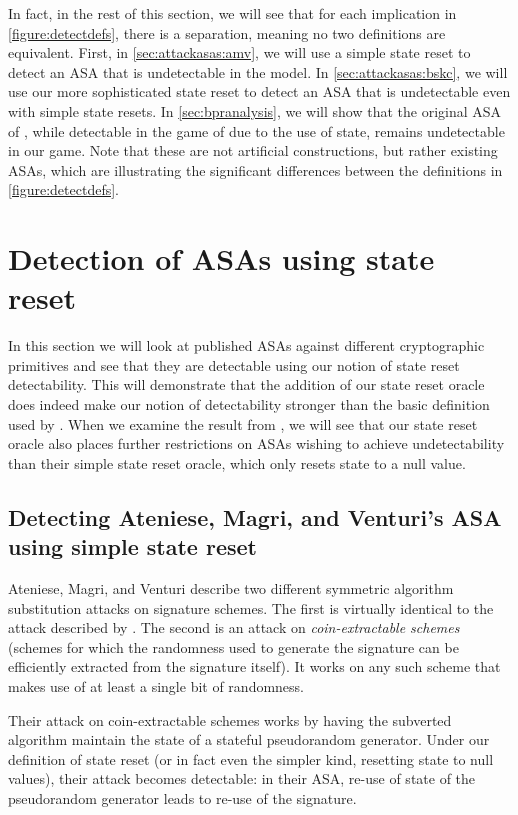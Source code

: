 In fact, in the rest of this section, we will see that for each implication in  \autoref{figure:detectdefs}, there is a separation, meaning no two definitions are equivalent. First, in \autoref{sec:attackasas:amv}, we will use a simple state reset to detect an ASA that is undetectable in the \cite{C:BelPatRog14} model. In \autoref{sec:attackasas:bskc}, we will use our more sophisticated state reset to detect an ASA that is undetectable even with simple state resets. In \autoref{sec:bpranalysis}, we will show that the original ASA of \cite{C:BelPatRog14}, while detectable in the game of \cite{CCS:BelJaeKan15} due to the use of state, remains undetectable in our game. Note that these are not artificial constructions, but rather existing ASAs, which are illustrating the significant differences between the definitions in \autoref{figure:detectdefs}.


\section{Detection of ASAs using state reset} \label{sec:attackasas}
In this section we will look at published ASAs against different cryptographic primitives and see that they are detectable using our notion of state reset detectability. This will demonstrate that the addition of our state reset oracle does indeed make our notion of detectability stronger than the basic definition used by \cite{C:BelPatRog14}. When we examine the result from \cite{BSKC2019}, we will see that our state reset oracle also places further restrictions on ASAs wishing to achieve undetectability than their simple state reset oracle, which only resets state to a null value.


\subsection{Detecting Ateniese, Magri, and Venturi's ASA using simple state reset} \label{sec:attackasas:amv}
Ateniese, Magri, and Venturi \cite{CCS:AteMagVen15} describe two different symmetric algorithm substitution attacks on signature schemes. The first is virtually identical to the attack described by \cite{CCS:BelJaeKan15}. The second is an attack on \emph{coin-extractable schemes} (schemes for which the randomness used to generate the signature can be efficiently extracted from the signature itself). It works on any such scheme that makes use of at least a single bit of randomness.

Their attack on coin-extractable schemes works by having the subverted algorithm maintain the state of a stateful pseudorandom generator. Under our definition of state reset (or in fact even the simpler kind, resetting state to null values), their attack becomes detectable: in their ASA, re-use of state of the pseudorandom generator leads to re-use of the signature.

